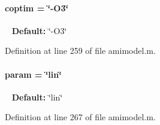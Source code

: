 \paragraph[{coptim}]{\setlength{\rightskip}{0pt plus 5cm}coptim = \char`\"{}-\/O3\char`\"{}}\label{classamimodel_ad99abcd270ac97546c46292ebc6c2e0a}
~\newline
{\bfseries Default\+:} \char`\"{}-\/\+O3\char`\"{} 

Definition at line 259 of file amimodel.\+m.

\hypertarget{classamimodel_a51f20d6b1b54a2eee3be0e8adc96a0ae}{}
\paragraph[{param}]{\setlength{\rightskip}{0pt plus 5cm}param = \char`\"{}lin\char`\"{}}\label{classamimodel_a51f20d6b1b54a2eee3be0e8adc96a0ae}
~\newline
{\bfseries Default\+:} \char`\"{}lin\char`\"{} 

Definition at line 267 of file amimodel.\+m.

